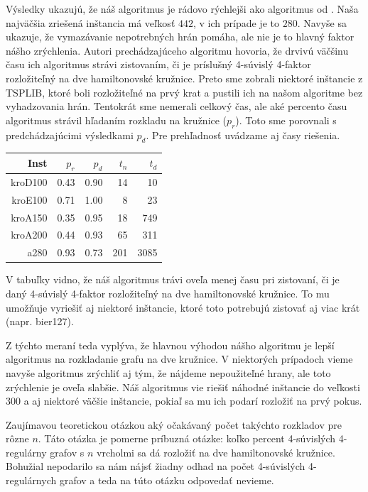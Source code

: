 Výsledky ukazujú, že náš algoritmus je rádovo rýchlejši ako algoritmus od \cite{duchenne}.
Naša najväčšia zriešená inštancia má veľkosť $442$, v ich prípade je to $280$.
Navyše sa ukazuje, že vymazávanie nepotrebných hrán pomáha, ale nie je to hlavný faktor nášho
zrýchlenia. Autori prechádzajúceho algoritmu hovoria, že drvivú väčšinu času ich algoritmus strávi
zistovaním, či je príslušný 4-súvislý 4-faktor rozložiteľný na dve hamiltonovské kružnice.
Preto sme zobrali niektoré inštancie z TSPLIB, ktoré boli rozložiteľné na prvý krat
a pustili ich na našom algoritme bez vyhadzovania hrán. Tentokrát sme nemerali celkový čas, ale
aké percento času algoritmus strávil hľadaním rozkladu na kružnice ($p_r$). Toto sme porovnali s
predchádzajúcimi výsledkami $p_d$. Pre prehľadnosť uvádzame aj časy riešenia.

\begin{table}[h]
\centering
\begin{tabular}{|r|r|r|r|r|}
\hline
Inst   & $p_r$ & $p_d$ & $t_n$ & $t_d$ \\\hline
kroD100& 0.43  & 0.90  & 14    & 10 \\\hline
kroE100& 0.71  & 1.00  & 8     & 23 \\\hline
kroA150& 0.35  & 0.95  & 18    & 749 \\\hline
kroA200& 0.44  & 0.93  & 65    & 311 \\\hline
a280   & 0.93  & 0.73  & 201   & 3085 \\\hline
\end{tabular}
\end{table}

V tabuľky vidno, že náš algoritmus trávi oveľa menej času pri zistovaní, či je daný 4-súvislý
4-faktor rozložiteľný na dve hamiltonovské kružnice. To mu umožňuje vyriešiť aj niektoré inštancie,
ktoré toto potrebujú zistovať aj viac krát (napr. bier127).

\bigskip

Z týchto meraní teda vyplýva, že hlavnou výhodou nášho algoritmu je lepší algoritmus na rozkladanie
grafu na dve kružnice. V niektorých prípadoch vieme navyše algoritmus zrýchliť aj tým, že nájdeme
nepoužiteľné hrany, ale toto zrýchlenie je oveľa slabšie. Náš algoritmus vie riešiť náhodné
inštancie do veľkosti 300 a aj niektoré väčšie inštancie, pokiaľ sa mu ich podarí rozložiť na prvý
pokus.

Zaujímavou teoretickou otázkou aký očakávaný počet takýchto rozkladov pre rôzne $n$.
Táto otázka je pomerne príbuzná otázke: koľko percent 4-súvislých 4-regulárny grafov s $n$ vrcholmi
sa dá rozložiť na dve hamiltonovské kružnice. Bohužial nepodarilo sa nám nájsť žiadny odhad
na počet 4-súvislých 4-regulárnych grafov a teda na túto otázku odpovedať nevieme.


